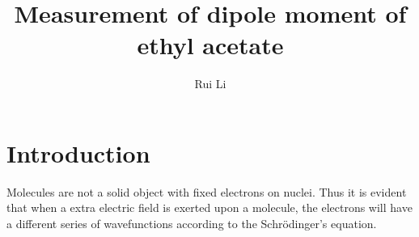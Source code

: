 \documentclass[%
 reprint,
 amsmath,amssymb,
 aps,
10.5pt,
]{revtex4-1}
\newcommand{\sch}{Schr\"odinger}
\begin{document}

\title{Measurement of dipole moment of ethyl acetate}%

\author{Rui Li}
%





\maketitle

\section{Introduction}
Molecules are not a solid object with fixed electrons on nuclei. Thus it is evident that when a extra electric field is exerted upon a molecule, the electrons will have a different series of wavefunctions according to the \sch's equation. 
\end{document}
